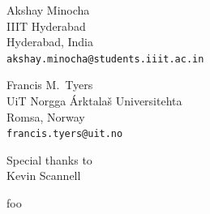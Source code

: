 \documentclass[a0paper,fontscale=0.3]{baposter}  %
\begin{document}
\begin{poster}
{			\vspace{-0.5em}
			\begin{center}
			{\begin{minipage}[t]{11.2em}
				\begin{spacing}{0.4}
					{Akshay Minocha}\\
					{\footnotesize IIIT Hyderabad\\Hyderabad, India\\\texttt{akshay.minocha@students.iiit.ac.in}}
				\end{spacing}
			\end{minipage}
			\begin{minipage}[t]{10.5em}
				\begin{spacing}{0.4}
					{Francis M.\ Tyers}\\
					{\footnotesize UiT Norgga Árktalaš Universitehta \\Romsa, Norway\\\texttt{francis.tyers@uit.no}}
				\end{spacing}
			\end{minipage}}
			\begin{minipage}[t]{5.5em}
				\vspace{-0.25em}
				\begin{spacing}{0.4}
					{\footnotesize Special thanks to}\\
					{\small Kevin Scannell}\\
				\end{spacing}
			\end{minipage}
			\end{center}
		}{
			foo
		}
\end{poster}
\end{document}
